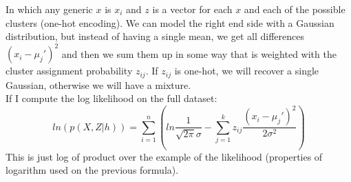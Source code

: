             In which any generic $x$ is $x_i$ and $z$ is a vector for each $x$ and each of the possible clusters (one-hot encoding). We can model the right end side with a Gaussian distribution, but instead of having a single mean, we get all differences $(x_i - \mu_j ') ^2$ and then we sum them up in some way that is weighted with the cluster assignment probability $z_{ij}$. 
            If $z_{ij}$ is one-hot, we will recover a single Gaussian, otherwise we will have a mixture. \\

            If I compute the log likelihood on the full dataset: 
            $$ln(p(X, Z| h)) = 
            \sum _{i=1} ^n 
            \left(
            ln \frac{1}{\sqrt{2 \pi} \sigma}
                - \sum _{j=1} ^k z_{ij}
                    \frac{(x_i - \mu_j ' )^2}{2 \sigma ^ 2}
            \right)
            $$
            This is just log of product over the example of the likelihood (properties of logarithm used on the previous formula). \\
            
